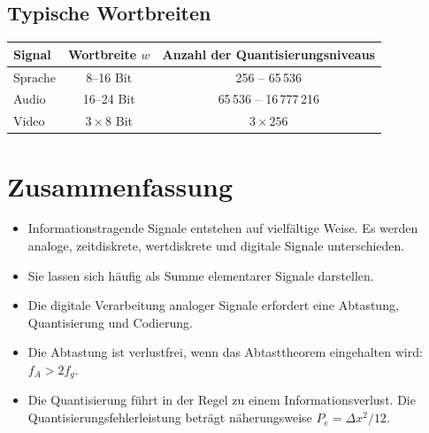 \subsection*{Typische Wortbreiten}

\begin{center}
\begin{tabular}{lcc}
\toprule
\textbf{Signal} & \textbf{Wortbreite $w$} & \textbf{Anzahl der Quantisierungsniveaus} \\
\midrule
Sprache & 8--16 Bit      & 256 -- 65\,536         \\
Audio   & 16--24 Bit     & 65\,536 -- 16\,777\,216 \\
Video   & $3 \times 8$ Bit & $3 \times 256$         \\
\bottomrule
\end{tabular}
\end{center}

\section*{Zusammenfassung}

\begin{itemize}
  \item Informationstragende Signale entstehen auf vielfältige Weise. Es werden analoge, zeitdiskrete, wertdiskrete und digitale Signale unterschieden.
  \item Sie lassen sich häufig als Summe elementarer Signale darstellen.
  \item Die digitale Verarbeitung analoger Signale erfordert eine Abtastung, Quantisierung und Codierung.
  \item Die Abtastung ist verlustfrei, wenn das Abtasttheorem eingehalten wird: $f_A > 2f_g$.
  \item Die Quantisierung führt in der Regel zu einem Informationsverlust. Die Quantisierungsfehlerleistung beträgt näherungsweise $P_e = \Delta x^2 / 12$.
\end{itemize}
